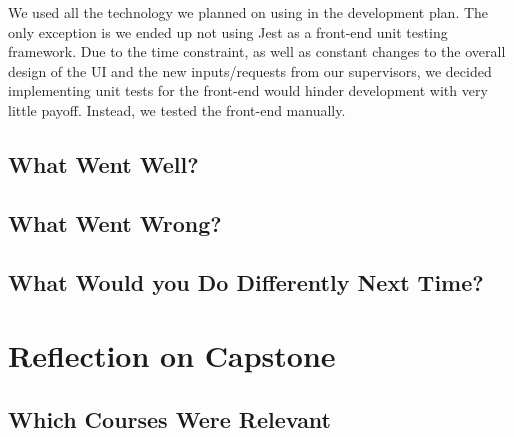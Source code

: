 \documentclass{article}
\begin{document}
We used all the technology we planned on using in the development plan. The only exception is we ended 
up not using Jest as a front-end unit testing framework. Due to the time constraint, as well as constant 
changes to the overall design of the UI and the new inputs/requests from our supervisors, we decided 
implementing unit tests for the front-end would hinder development with very little payoff. Instead, 
we tested the front-end manually.

\subsection{What Went Well?}


\subsection{What Went Wrong?}


\subsection{What Would you Do Differently Next Time?}


\section{Reflection on Capstone}


\subsection{Which Courses Were Relevant}
\end{document}
